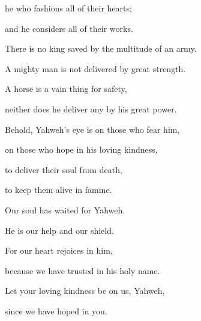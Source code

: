 {\par }{\QB {}he who fashions all of their hearts;
\par }{\QB and he considers all of their works.
\par }{\Q {}There is no king saved by the multitude of an army.
\par }{\QB A mighty man is not delivered by great strength.
\par }{\Q {}A horse is a vain thing for safety,
\par }{\QB neither does he deliver any by his great power.
\par }{\Q {}Behold, Yahweh’s eye is on those who fear him,
\par }{\QB on those who hope in his loving kindness,
\par }{\QB {}to deliver their soul from death,
\par }{\QB to keep them alive in famine.
\par }{\Q {}Our soul has waited for Yahweh.
\par }{\QB He is our help and our shield.
\par }{\Q {}For our heart rejoices in him,
\par }{\QB because we have trusted in his holy name.
\par }{\Q {}Let your loving kindness be on us, Yahweh,
\par }{\QB since we have hoped in you.

}
